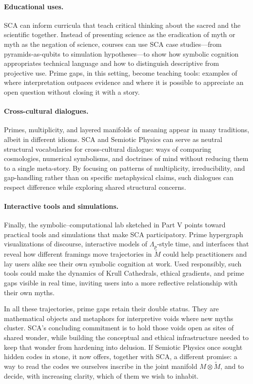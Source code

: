 \documentclass[12]{amsart}
\theoremstyle{plain}
\begin{document}
\paragraph{Educational uses.} SCA can inform curricula that teach critical thinking about the sacred and the scientific together. Instead of presenting science as the eradication of myth or myth as the negation of science, courses can use SCA case studies---from pyramids-as-qubits to simulation hypotheses---to show how symbolic cognition appropriates technical language and how to distinguish descriptive from projective use. Prime gaps, in this setting, become teaching tools: examples of where interpretation outpaces evidence and where it is possible to appreciate an open question without closing it with a story.

\paragraph{Cross-cultural dialogues.} Primes, multiplicity, and layered manifolds of meaning appear in many traditions, albeit in different idioms. SCA and Semiotic Physics can serve as neutral structural vocabularies for cross-cultural dialogue: ways of comparing cosmologies, numerical symbolisms, and doctrines of mind without reducing them to a single meta-story. By focusing on patterns of multiplicity, irreducibility, and gap-handling rather than on specific metaphysical claims, such dialogues can respect difference while exploring shared structural concerns.

\paragraph{Interactive tools and simulations.} Finally, the symbolic–computational lab sketched in Part V points toward practical tools and simulations that make SCA participatory. Prime hypergraph visualizations of discourse, interactive models of $\Lambda_p$-style time, and interfaces that reveal how different framings move trajectories in $\tilde M$ could help practitioners and lay users alike see their own symbolic cognition at work. Used responsibly, such tools could make the dynamics of Krull Cathedrals, ethical gradients, and prime gaps visible in real time, inviting users into a more reflective relationship with their own myths.

In all these trajectories, prime gaps retain their double status. They are mathematical objects and metaphors for interpretive voids where new myths cluster. SCA's concluding commitment is to hold those voids open as sites of shared wonder, while building the conceptual and ethical infrastructure needed to keep that wonder from hardening into delusion. If Semiotic Physics once sought hidden codes in stone, it now offers, together with SCA, a different promise: a way to read the codes we ourselves inscribe in the joint manifold $M \otimes \tilde M$, and to decide, with increasing clarity, which of them we wish to inhabit.


\nocite{*}


\clearpage
\end{document}
